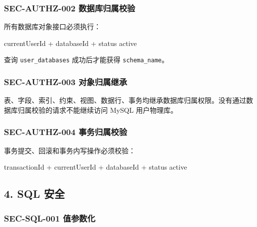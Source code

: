 \documentclass[
  a4paper,
  UTF8]{ctexart}
\newenvironment{Shaded}{}{}
\newcommand{\NormalTok}[1]{#1}
\begin{document}
\hypertarget{sec-authz-002-ux6570ux636eux5e93ux5f52ux5c5eux6821ux9a8c}{%
\subsubsection{SEC-AUTHZ-002
数据库归属校验}\label{sec-authz-002-ux6570ux636eux5e93ux5f52ux5c5eux6821ux9a8c}}

所有数据库对象接口必须执行：

\begin{Shaded}
\begin{Highlighting}[]
\NormalTok{currentUserId + databaseId + status active}
\end{Highlighting}
\end{Shaded}

查询 \texttt{user\_databases} 成功后才能获得 \texttt{schema\_name}。

\hypertarget{sec-authz-003-ux5bf9ux8c61ux5f52ux5c5eux7ee7ux627f}{%
\subsubsection{SEC-AUTHZ-003
对象归属继承}\label{sec-authz-003-ux5bf9ux8c61ux5f52ux5c5eux7ee7ux627f}}

表、字段、索引、约束、视图、数据行、事务均继承数据库归属权限。没有通过数据库归属校验的请求不能继续访问
MySQL 用户物理库。

\hypertarget{sec-authz-004-ux4e8bux52a1ux5f52ux5c5eux6821ux9a8c}{%
\subsubsection{SEC-AUTHZ-004
事务归属校验}\label{sec-authz-004-ux4e8bux52a1ux5f52ux5c5eux6821ux9a8c}}

事务提交、回滚和事务内写操作必须校验：

\begin{Shaded}
\begin{Highlighting}[]
\NormalTok{transactionId + currentUserId + databaseId + status active}
\end{Highlighting}
\end{Shaded}

\hypertarget{sql-ux5b89ux5168}{%
\subsection{4. SQL 安全}\label{sql-ux5b89ux5168}}

\hypertarget{sec-sql-001-ux503cux53c2ux6570ux5316}{%
\subsubsection{SEC-SQL-001
值参数化}\label{sec-sql-001-ux503cux53c2ux6570ux5316}}
\end{document}
